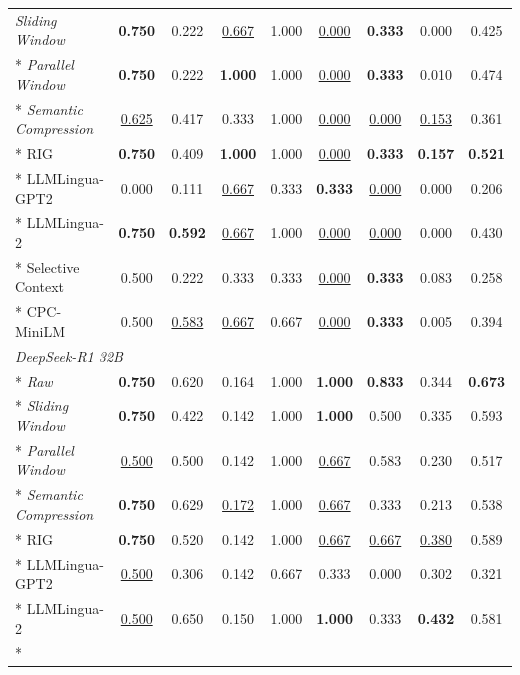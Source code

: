 {\begin{longtable}{lcc|cc|cc|c|c}
\textit{Sliding Window}        & \textbf{0.750} & 0.222 & \underline{0.667} & 1.000 & \underline{0.000} & \textbf{0.333} & 0.000 & 0.425 \\*
\textit{Parallel Window}       & \textbf{0.750} & 0.222 & \textbf{1.000} & 1.000 & \underline{0.000} & \textbf{0.333} & 0.010 & 0.474 \\*
\textit{Semantic Compression}  & \underline{0.625} & 0.417 & 0.333 & 1.000 & \underline{0.000} & \underline{0.000} & \underline{0.153} & 0.361 \\*
RIG                            & \textbf{0.750} & 0.409 & \textbf{1.000} & 1.000 & \underline{0.000} & \textbf{0.333} & \textbf{0.157} & \textbf{0.521} \\*
LLMLingua-GPT2                 & 0.000 & 0.111 & \underline{0.667} & 0.333 & \textbf{0.333} & \underline{0.000} & 0.000 & 0.206 \\*
LLMLingua-2                    & \textbf{0.750} & \textbf{0.592} & \underline{0.667} & 1.000 & \underline{0.000} & \underline{0.000} & 0.000 & 0.430 \\*
Selective Context              & 0.500 & 0.222 & 0.333 & 0.333 & \underline{0.000} & \textbf{0.333} & 0.083 & 0.258 \\*
CPC-MiniLM                     & 0.500 & \underline{0.583} & \underline{0.667} & 0.667 & \underline{0.000} & \textbf{0.333} & 0.005 & 0.394 \\
\midrule
\multicolumn{9}{l}{\textit{DeepSeek-R1 32B}} \\*
\textit{Raw}                   & \textbf{0.750} & 0.620 & 0.164 & 1.000 & \textbf{1.000} & \textbf{0.833} & 0.344 & \textbf{0.673} \\*
\textit{Sliding Window}        & \textbf{0.750} & 0.422 & 0.142 & 1.000 & \textbf{1.000} & 0.500 & 0.335 & 0.593 \\*
\textit{Parallel Window}       & \underline{0.500} & 0.500 & 0.142 & 1.000 & \underline{0.667} & 0.583 & 0.230 & 0.517 \\*
\textit{Semantic Compression}  & \textbf{0.750} & 0.629 & \underline{0.172} & 1.000 & \underline{0.667} & 0.333 & 0.213 & 0.538 \\*
RIG                            & \textbf{0.750} & 0.520 & 0.142 & 1.000 & \underline{0.667} & \underline{0.667} & \underline{0.380} & 0.589 \\*
LLMLingua-GPT2                 & \underline{0.500} & 0.306 & 0.142 & 0.667 & 0.333 & 0.000 & 0.302 & 0.321 \\*
LLMLingua-2                    & \underline{0.500} & 0.650 & 0.150 & 1.000 & \textbf{1.000} & 0.333 & \textbf{0.432} & 0.581 \\*

\end{longtable}}
